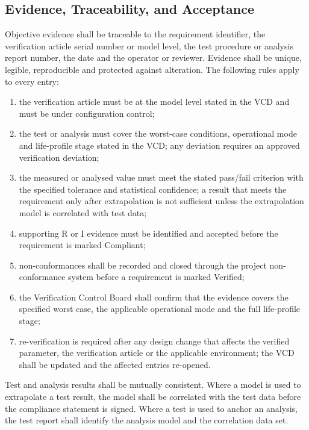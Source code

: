 \subsection{Evidence, Traceability, and Acceptance}

Objective evidence shall be traceable to the requirement identifier, the verification article serial number or model level, the test procedure or analysis report number, the date and the operator or reviewer. Evidence shall be unique, legible, reproducible and protected against alteration. The following rules apply to every entry:
\begin{enumerate}
    \item the verification article must be at the model level stated in the VCD and must be under configuration control;
    \item the test or analysis must cover the worst-case conditions, operational mode and life-profile stage stated in the VCD; any deviation requires an approved verification deviation;
    \item the measured or analysed value must meet the stated pass/fail criterion with the specified tolerance and statistical confidence; a result that meets the requirement only after extrapolation is not sufficient unless the extrapolation model is correlated with test data;
    \item supporting R or I evidence must be identified and accepted before the requirement is marked Compliant;
    \item non-conformances shall be recorded and closed through the project non-conformance system before a requirement is marked Verified;
    \item the Verification Control Board shall confirm that the evidence covers the specified worst case, the applicable operational mode and the full life-profile stage;
    \item re-verification is required after any design change that affects the verified parameter, the verification article or the applicable environment; the VCD shall be updated and the affected entries re-opened.
\end{enumerate}

Test and analysis results shall be mutually consistent. Where a model is used to extrapolate a test result, the model shall be correlated with the test data before the compliance statement is signed. Where a test is used to anchor an analysis, the test report shall identify the analysis model and the correlation data set.

